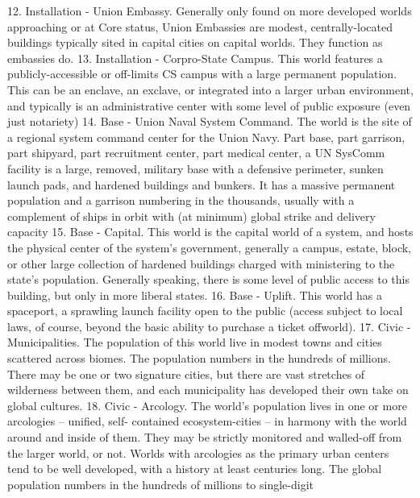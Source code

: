      12. Installation - Union Embassy. Generally only found on more developed worlds
         approaching or at Core status, Union Embassies are modest, centrally-located buildings
         typically sited in capital cities on capital worlds. They function as embassies do.
     13. Installation - Corpro-State Campus. This world features a publicly-accessible or off-limits
         CS campus with a large permanent population. This can be an enclave, an exclave, or
         integrated into a larger urban environment, and typically is an administrative center with
         some level of public exposure (even just notariety)
     14. Base - Union Naval System Command. The world is the site of a regional system
         command center for the Union Navy. Part base, part garrison, part shipyard, part
         recruitment center, part medical center, a UN SysComm facility is a large, removed,
         military base with a defensive perimeter, sunken launch pads, and hardened buildings and
         bunkers. It has a massive permanent population and a garrison numbering in the
         thousands, usually with a complement of ships in orbit with (at minimum) global strike and
         delivery capacity
     15. Base - Capital. This world is the capital world of a system, and hosts the physical center of
         the system’s government, generally a campus, estate, block, or other large collection of
         hardened buildings charged with ministering to the state’s population. Generally speaking,
         there is some level of public access to this building, but only in more liberal states.
     16. Base - Uplift. This world has a spaceport, a sprawling launch facility open to the public
         (access subject to local laws, of course, beyond the basic ability to purchase a ticket
         offworld).
     17. Civic - Municipalities. The population of this world live in modest towns and cities scattered
         across biomes. The population numbers in the hundreds of millions. There may be one or
         two signature cities, but there are vast stretches of wilderness between them, and each
         municipality has developed their own take on global cultures.
     18. Civic - Arcology. The world’s population lives in one or more arcologies -- unified, self-
         contained ecosystem-cities -- in harmony with the world around and inside of them. They
         may be strictly monitored and walled-off from the larger world, or not. Worlds with
         arcologies as the primary urban centers tend to be well developed, with a history at least
         centuries long. The global population numbers in the hundreds of millions to single-digit
